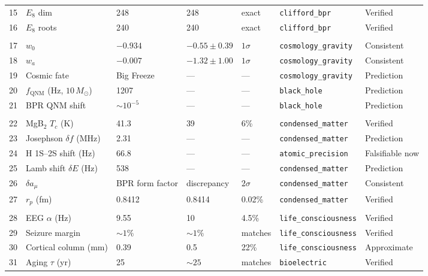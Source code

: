\documentclass[aps,prd,twocolumn,superscriptaddress,longbibliography,nofootinbib]{revtex4-2}
\begin{document}
\begin{table}[t]
\begin{ruledtabular}
\begin{tabular}{rllllll}
15 & $E_8$ dim & 248 & 248 & exact &
   \texttt{clifford\_bpr} & Verified \\
16 & $E_8$ roots & 240 & 240 & exact &
   \texttt{clifford\_bpr} & Verified \\
\colrule
\multicolumn{7}{c}{\textit{Cosmology}} \\
17 & $w_0$ & $-0.934$ & $-0.55 \pm 0.39$ & $1\sigma$ &
   \texttt{cosmology\_gravity} & Consistent \\
18 & $w_a$ & $-0.007$ & $-1.32 \pm 1.00$ & $1\sigma$ &
   \texttt{cosmology\_gravity} & Consistent \\
19 & Cosmic fate & Big Freeze & --- & --- &
   \texttt{cosmology\_gravity} & Prediction \\
20 & $f_{\mathrm{QNM}}$ (Hz, $10\,M_\odot$) & 1207 & --- & --- &
   \texttt{black\_hole} & Prediction \\
21 & BPR QNM shift & $\sim\!10^{-5}$ & --- & --- &
   \texttt{black\_hole} & Prediction \\
\colrule
\multicolumn{7}{c}{\textit{Condensed Matter \& Atomic}} \\
22 & MgB$_2$ $T_c$ (K) & 41.3 & 39 & 6\% &
   \texttt{condensed\_matter} & Verified \\
23 & Josephson $\delta f$ (MHz) & 2.31 & --- & --- &
   \texttt{condensed\_matter} & Prediction \\
24 & H 1S--2S shift (Hz) & 66.8 & --- & --- &
   \texttt{atomic\_precision} & Falsifiable now \\
25 & Lamb shift $\delta E$ (Hz) & 538 & --- & --- &
   \texttt{condensed\_matter} & Prediction \\
26 & $\delta a_\mu$ & BPR form factor & discrepancy &
   $2\sigma$ & \texttt{condensed\_matter} & Consistent \\
27 & $r_p$ (fm) & 0.8412 & 0.8414 & 0.02\% &
   \texttt{condensed\_matter} & Verified \\
\colrule
\multicolumn{7}{c}{\textit{Biology}} \\
28 & EEG $\alpha$ (Hz) & 9.55 & 10 & 4.5\% &
   \texttt{life\_consciousness} & Verified \\
29 & Seizure margin & $\sim\!1\%$ & $\sim\!1\%$ & matches &
   \texttt{life\_consciousness} & Verified \\
30 & Cortical column (mm) & 0.39 & 0.5 & 22\% &
   \texttt{life\_consciousness} & Approximate \\
31 & Aging $\tau$ (yr) & 25 & $\sim\!25$ & matches &
   \texttt{bioelectric} & Verified \\
\end{tabular}
\end{ruledtabular}
\end{table}
\end{document}
